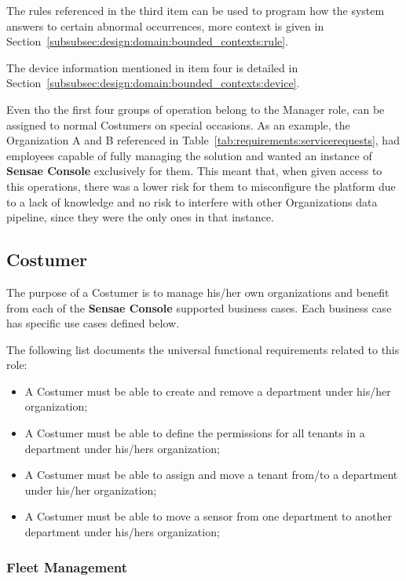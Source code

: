 The rules referenced in the third item can be used to program how the system answers to certain abnormal occurrences, more context is given in Section~\ref{subsubsec:design:domain:bounded_contexts:rule}.

The device information mentioned in item four is detailed in Section~\ref{subsubsec:design:domain:bounded_contexts:device}.

Even tho the first four groups of operation belong to the Manager role, can be assigned to normal Costumers on special occasions. As an example, the Organization A and B referenced in Table~\ref{tab:requirements:servicerequests}, had employees capable of fully managing the solution and wanted an instance of \textbf{Sensae Console} exclusively for them. This meant that, when given access to this operations, there was a lower risk for them to misconfigure the platform due to a lack of knowledge and no risk to interfere with other Organizations data pipeline, since they were the only ones in that instance.

\subsection{Costumer}
\label{subsec:requirements:functional:costumer}

The purpose of a Costumer is to manage his/her own organizations and benefit from each of the \textbf{Sensae Console} supported business cases. Each business case has specific use cases defined below.

The following list documents the universal functional requirements related to this role:

\begin{itemize}
    \item A Costumer must be able to create and remove a department under his/her organization;
    \item A Costumer must be able to define the permissions for all tenants in a department under his/hers organization;
    \item A Costumer must be able to assign and move a tenant from/to a department under his/her organization;
    \item A Costumer must be able to move a sensor from one department to another department under his/hers organization;
\end{itemize}

\subsubsection{Fleet Management}
\label{subsubsec:requirements:functional:costumer:fleet}

